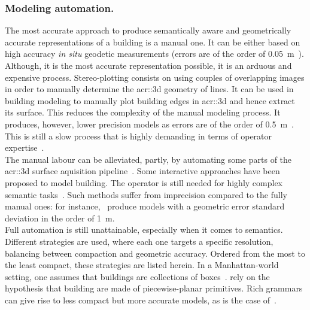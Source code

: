         \subsubsection{Modeling automation.}
            The most accurate approach to produce semantically aware and geometrically accurate representations of a building is a manual one.
            It can be either based on high accuracy \textit{in situ} geodetic measurements (errors are of the order of \SI{0.05}{\m}~\parencite{kaartinen2005accuracy}).
            Although, it is the most accurate representation possible, it is an arduous and expensive process.
            Stereo-plotting consists on using couples of overlapping images in order to manually determine the \gls{acr::3d} geometry of lines.
            It can be used in building modeling to manually plot building edges in \gls{acr::3d} and hence extract its surface.
            This reduces the complexity of the manual modeling process.
            It produces, however, lower precision models as errors are of the order of \SI{0.5}{\m}~\parencite{jamet1995building}.
            This is still a slow process that is highly demanding in terms of operator expertise~\parencite{ruther2002application}.\\
            The manual labour can be alleviated, partly, by automating some parts of the \gls{acr::3d} surface aquisition pipeline~\parencite{musialski2013survey}.
            Some interactive approaches have been proposed to model building.
            The operator is still needed for highly complex semantic tasks~\parencite{mayunga2005semi, castellazzi2015laser}.
            Such methods suffer from imprecision compared to the fully manual ones: for instance,~\textcite{mayunga2005semi} produce models with a geometric error standard deviation in the order of \SI{1}{\m}.\\
            Full automation is still unattainable, especially when it comes to semantics.
            Different strategies are used, where each one targets a specific resolution, balancing between compaction and geometric accuracy.
            Ordered from the most to the least compact, these strategies are listed herein.
            In a Manhattan-world setting, one assumes that buildings are collections of boxes~\parencite{vanegas2010building, li2016manhattan}.
            \textcite{lafarge2012creating, nan2017polyfit} rely on the hypothesis that building are made of piecewise-planar primitives.
            Rich grammars can give rise to less compact but more accurate models, as is the case of~\textcite{demir2015procedural,zeng2018neural}.
